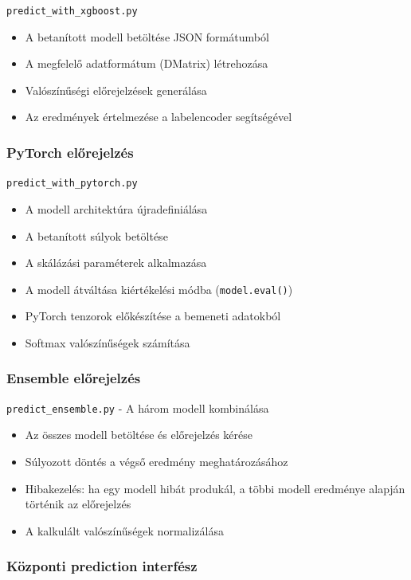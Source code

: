\texttt{predict\_with\_xgboost.py}

\begin{itemize}
    \item A betanított modell betöltése JSON formátumból
    \item A megfelelő adatformátum (DMatrix) létrehozása
    \item Valószínűségi előrejelzések generálása
    \item Az eredmények értelmezése a labelencoder segítségével
\end{itemize}

\subsubsection{PyTorch előrejelzés}

\texttt{predict\_with\_pytorch.py}

\begin{itemize}
    \item A modell architektúra újradefiniálása
    \item A betanított súlyok betöltése
    \item A skálázási paraméterek alkalmazása
    \item A modell átváltása kiértékelési módba (\texttt{model.eval()})
    \item PyTorch tenzorok előkészítése a bemeneti adatokból
    \item Softmax valószínűségek számítása
\end{itemize}

\subsubsection{Ensemble előrejelzés}

\texttt{predict\_ensemble.py} - A három modell kombinálása

\begin{itemize}
    \item Az összes modell betöltése és előrejelzés kérése
    \item Súlyozott döntés a végső eredmény meghatározásához
    \item Hibakezelés: ha egy modell hibát produkál, a többi modell eredménye alapján történik az előrejelzés
    \item A kalkulált valószínűségek normalizálása
\end{itemize}

\subsubsection{Központi prediction interfész}

